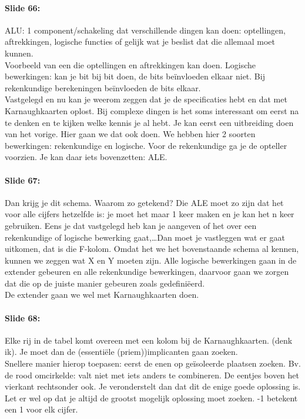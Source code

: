 \documentclass[10pt,a4paper]{book}
\begin{document}
\paragraph{Slide 66:} ALU: 1 component/schakeling dat verschillende dingen kan doen: optellingen, aftrekkingen, logische functies of gelijk wat je beslist dat die allemaal moet kunnen.\\
Voorbeeld van een die optellingen en aftrekkingen kan doen. Logische bewerkingen: kan je bit bij bit doen, de bits be\"invloeden elkaar niet. Bij rekenkundige berekeningen be\"invloeden de bits elkaar.\\
Vastgelegd en nu kan je weerom zeggen dat je de specificaties hebt en dat met Karnaughkaarten oplost. Bij complexe dingen is het soms interessant om eerst na te denken en te kijken welke kennis je al hebt. Je kan eerst een uitbreiding doen van het vorige. Hier gaan we dat ook doen. We hebben hier 2 soorten bewerkingen: rekenkundige en logische. Voor de rekenkundige ga je de opteller voorzien. Je kan daar iets bovenzetten: ALE.

\paragraph{Slide 67:} Dan krijg je dit schema. Waarom zo getekend? Die ALE moet zo zijn dat het voor alle cijfers hetzelfde is: je moet het maar 1 keer maken en je kan het n keer gebruiken. Eens je dat vastgelegd heb kan je aangeven of het over een rekenkundige of logische bewerking gaat,\ldots Dan moet je vastleggen wat er gaat uitkomen, dat is die F-kolom. Omdat het we het bovenstaande schema al kennen, kunnen we zeggen wat X en Y moeten zijn. Alle logische bewerkingen gaan in de extender gebeuren en alle rekenkundige bewerkingen, daarvoor gaan we zorgen dat die op de juiste manier gebeuren zoals gedefini\"eerd.\\
De extender gaan we wel met Karnaughkaarten doen.

\paragraph{Slide 68:} Elke rij in de tabel komt overeen met een kolom bij de Karnaughkaarten. (denk ik). Je moet dan de (essenti\"ele (priem))implicanten gaan zoeken.\\
Snellere manier hierop toepasen: eerst de enen op ge\"isoleerde plaatsen zoeken. Bv. de rood omcirkelde: valt niet met iets anders te combineren. De eentjes boven het vierkant rechtsonder ook. Je veronderstelt dan dat dit de enige goede oplossing is. Let er wel op dat je altijd de grootst mogelijk oplossing moet zoeken. -1 betekent een 1 voor elk cijfer.
\end{document}
